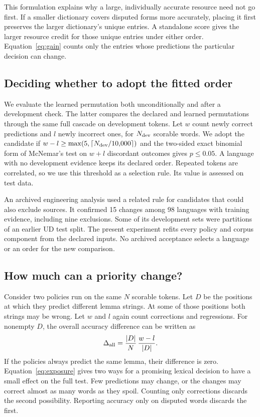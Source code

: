 \documentclass[11pt]{article}
\begin{document}
This formulation explains why a large, individually accurate resource need
not go first. If a smaller dictionary covers disputed forms more accurately,
placing it first preserves the larger dictionary's unique entries. A
standalone score gives the larger resource credit for those unique entries
under either order. Equation~\ref{eq:gain} counts only the entries whose
predictions the particular decision can change.

\subsection{Deciding whether to adopt the fitted order}

We evaluate the learned permutation both unconditionally and after a
development check. The latter compares the declared and learned permutations
through the same full cascade on development tokens. Let \(w\) count newly
correct predictions and \(l\) newly incorrect ones, for \(N_{\rm dev}\)
scorable words. We adopt the candidate if
\(w-l\geq\max(5,\lceil N_{\rm dev}/10{,}000\rceil)\) and the two-sided exact
binomial form of McNemar's test on \(w+l\) discordant outcomes gives
\(p\leq0.05\). A language with no development evidence keeps its declared
order. Repeated tokens are correlated, so we use this threshold as a
selection rule. Its value is assessed on test data.

An archived engineering analysis used a related rule for candidates that
could also exclude sources. It confirmed 15 changes among 98 languages with
training evidence, including nine exclusions. Some of its development sets
were partitions of an earlier UD test split. The present experiment refits
every policy and corpus component from the declared inputs. No archived
acceptance selects a language or an order for the new comparison.

\subsection{How much can a priority change?}

Consider two policies run on the same \(N\) scorable tokens. Let \(D\) be
the positions at which they predict different lemma strings. At some of those
positions both strings may be wrong. Let \(w\) and \(l\) again count
corrections and regressions. For nonempty \(D\), the overall accuracy difference
can be written as
\begin{equation}
  \Delta_{\rm all}
  = \frac{|D|}{N}\,\frac{w-l}{|D|}.
  \label{eq:exposure}
\end{equation}
If the policies always predict the same lemma, their difference is zero.
Equation~\ref{eq:exposure} gives two ways for a promising lexical decision
to have a small effect on the full test. Few predictions may change, or the
changes may correct almost as many words as they spoil. Counting only
corrections discards the second possibility. Reporting accuracy only on
disputed words discards the first.
\end{document}
